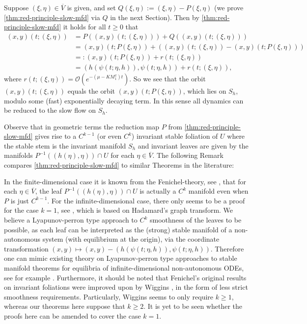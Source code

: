 \documentclass[a4paper]{siamart190516}
\begin{document}
 Suppose $(\xi, \eta) \in \overline{V}$ is given, and set $Q(\xi,\eta) := (\xi,\eta) - P(\xi,\eta)$ (we prove \cref{thm:red-principle-slow-mfd} via $Q$ in the next Section). Then by \cref{thm:red-principle-slow-mfd} it holds for all $t \geq 0$ that
 \begin{align*}
 (x,y)(t; (\xi,\eta)) &= P ((x,y)(t; (\xi,\eta))) + Q ((x,y)(t; (\xi,\eta))) \\
 &= (x,y)(t; P(\xi,\eta)) + ((x,y)(t; (\xi,\eta)) - (x,y)(t; P(\xi,\eta)) ) \\
 &=: (x,y)(t; P(\xi,\eta)) + r(t;(\xi,\eta)) \\
 &= (h(\psi(t; \eta,h)),\psi(t; \eta,h)) +  r(t;(\xi,\eta)),
 \end{align*}
 where $r(t;(\xi,\eta)) =  \mathcal{O}\left(e^{-(\mu-K M^x_1) t}\right)$. So we see that the orbit $(x,y)(t; (\xi,\eta))$ equals the orbit $(x,y)(t; P(\xi,\eta))$, which lies on $S_h$, modulo some (fast) exponentially decaying term. In this sense all dynamics can be reduced to the slow flow on $S_h$.
 
 Observe that in geometric terms the reduction map $P$ from \cref{thm:red-principle-slow-mfd} gives rise to a $C^{k-1}$ (or even $C^k$) invariant
 stable foliation of $U$ where the stable stem is the invariant manifold $S_h$ and
 invariant leaves are given by the manifolds $P^{-1}((h(\eta),\eta)) \cap U$ for each
 $\eta \in \overline{V}$. The following Remark compares
 \cref{thm:red-principle-slow-mfd} to similar Theorems in the literature:
 
 \begin{remark}
In the finite-dimensional case it is known from the Fenichel-theory, see \cite{Fe79}, that for each $\eta \in \overline{V}$, the leaf $P^{-1}((h(\eta),\eta)) \cap U$ 
is actually a $C^k$ manifold even when $P$ is just $C^{k-1}$. For the infinite-dimensional case, there only seems to be a proof for the case $k=1$, see \cite{BaLuZe00}, 
which is based on Hadamard's graph transform. We believe a Lyapunov-perron type approach to $C^k$ smoothness of the leaves to be possible, as each leaf can be interpreted 
as the (strong) stable manifold of a non-autonomous system (with equilibrium at the origin), via the coordinate transformation $(x,y) \mapsto (x,y) - (h(\psi(t; \eta,h)), \psi(t; \eta,h))$. 
Therefore one can mimic existing theory on Lyapunov-perron type approaches to stable manifold theorems for equilibria of infinite-dimensional non-autonomous ODEs, 
see for example \cite{ChLiLu91}. 
Furthermore, it should be noted that Fenichel's original results on invariant foliations \cite{Fe74, Fe77, Fe79} were improved upon by Wiggins
\cite{Wi94}, in the form of less strict smoothness requirements. Particularly, Wiggins seems to only require $k \geq 1$, whereas our theorems here
suppose that $k \geq 2$. It is yet to be seen whether the proofs here can be amended to cover the case $k=1$.
 \end{remark}
 
\end{document}
